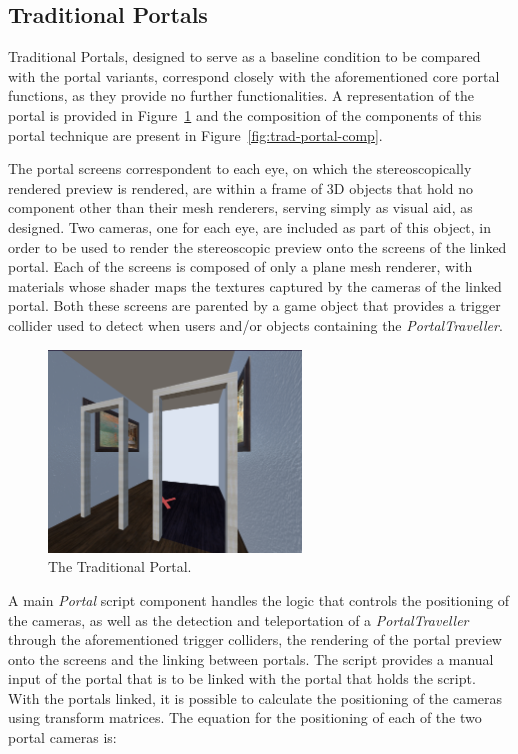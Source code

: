 \subsection{Traditional Portals}
\label{sec:trad-portals}

Traditional Portals, designed to serve as a baseline condition to be compared with the portal variants, correspond closely with 
the aforementioned core portal functions, as they provide no further functionalities. A representation of the portal is provided in 
Figure~\ref{fig:trad-portal-sc} and the composition of the components of this 
portal technique are present in Figure~\ref{fig:trad-portal-comp}.

The portal screens correspondent to each eye, on which the stereoscopically rendered preview is rendered, are within a frame of 3D objects 
that hold no component other than their mesh renderers, serving simply as visual aid, as designed. 
Two cameras, one for each eye, are included as part of this object, in order to be used to render the stereoscopic preview onto the screens of
the linked portal.
Each of the screens is composed of only a plane mesh renderer, with materials whose shader maps the textures captured by the cameras of the 
linked portal. 
Both these screens are parented by a game object that provides a trigger collider used to detect when users and/or objects containing the 
\textit{PortalTraveller}. 

\begin{figure}[t]
    \centering
     \includegraphics[width=0.6\textwidth]{NOVAthesisFiles/Images/screenshots/traditional-portal.PNG}
     \caption[The Traditional Portal.]
     {The Traditional Portal.}
     \label{fig:trad-portal-sc}
\end{figure}

A main \textit{Portal} script component handles the logic that controls the positioning of the cameras, as well as the detection and 
teleportation of a \textit{PortalTraveller} through the aforementioned trigger colliders, the rendering of the portal preview onto 
the screens and the linking between portals. The script provides a manual input of the portal that is to be linked with the portal that 
holds the script. 
With the portals linked, it is possible to calculate the positioning of the cameras using transform matrices. 
The equation for the positioning of each of the two portal cameras is:

